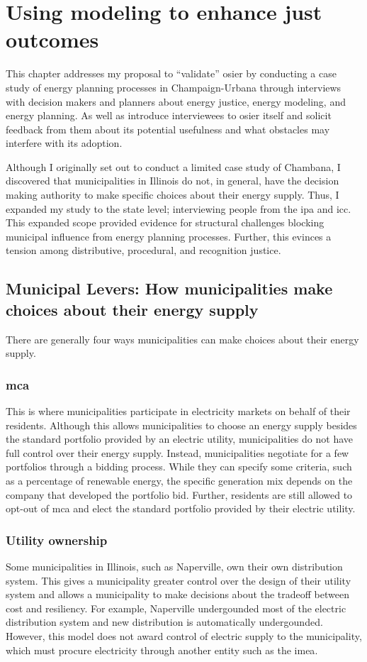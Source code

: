 \chapter{Using modeling to enhance just outcomes}
\iffalse


This chapter addresses my proposal to ``validate'' \ac{osier} by conducting a
case study of energy planning processes in Champaign-Urbana through interviews
with decision makers and planners about energy justice, energy modeling, and
energy planning. As well as introduce interviewees to \ac{osier} itself and
solicit feedback from them about its potential usefulness and what obstacles may
interfere with its adoption. 

Although I originally set out to conduct a limited case study of Chambana, I
discovered that municipalities in Illinois do not, in general, have the decision
making authority to make specific choices about their energy supply. Thus, I
expanded my study to the state level; interviewing people from the \ac{ipa} and
\ac{icc}. This expanded scope provided evidence for structural challenges
blocking municipal influence from energy planning processes. Further, this
evinces a tension among distributive, procedural, and recognition justice.

\section{Municipal Levers: How municipalities make choices about their energy supply}
There are generally four ways municipalities can make choices about their energy
supply.

\subsection{\ac{mca}} This is where municipalities participate in electricity
markets on behalf of their residents. Although this allows municipalities to
choose an energy supply besides the standard portfolio provided by an electric
utility, municipalities do not have full control over their energy supply.
Instead, municipalities negotiate for a few portfolios through a bidding
process. While they can specify some criteria, such as a percentage of renewable
energy, the specific generation mix depends on the company that developed the
portfolio bid. Further, residents are still allowed to opt-out of \ac{mca} and
elect the standard portfolio provided by their electric utility.

\subsection{Utility ownership}
Some municipalities in Illinois, such as Naperville, own their own distribution
system. This gives a municipality greater control over the design of their
utility system and allows a municipality to make decisions about the tradeoff
between cost and resiliency. For example, Naperville undergounded most of the
electric distribution system and new distribution is automatically undergounded.
However, this model does not award control of electric supply to the
municipality, which must procure electricity through another entity such as the
\acf{imea}.

